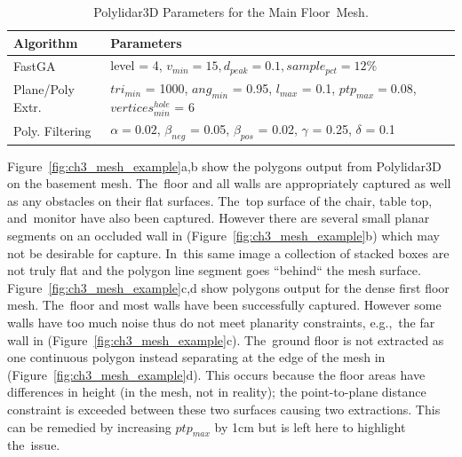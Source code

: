 \begin{table}[H]
\centering
\caption{Polylidar3D Parameters for the Main Floor~Mesh.}\label{table:mesh_parameters_b}
\begin{tabular}{@{}ll@{}}
\toprule
\textbf{Algorithm}        & \textbf{Parameters}                                                          \\ \midrule
FastGA           & level = 4,  $v_{min} = 15, d_{peak} = 0.1, sample_{pct} = 12\%$            \\
Plane/Poly Extr.      & $tri_{min}$ = 1000, $ang_{min}$ = 0.95, $l_{max}$ = 0.1, $ptp_{max} = 0.08$, $vertices^{hole}_{min}$ = 6     \\
Poly. Filtering      & $\alpha = 0.02$, $\beta_{neg}$ = 0.05, $\beta_{pos}$ = 0.02, $\gamma$ = 0.25, $\delta$ = 0.1    \\ \bottomrule
\end{tabular}
\end{table}

Figure~\ref{fig:ch3_mesh_example}a,b show the polygons output from Polylidar3D on the basement mesh.  The~floor and all walls are appropriately captured as well as any obstacles on their flat surfaces. The~top surface of the chair, table top, and~monitor have also been captured. However there are several small planar segments on an occluded wall in (Figure~\ref{fig:ch3_mesh_example}b) which may not be desirable for capture. In~this same image a collection of stacked boxes are not truly flat and the polygon line segment goes ``behind`` the mesh surface.  Figure~\ref{fig:ch3_mesh_example}c,d show  polygons output for the dense first floor mesh. The~floor and most walls have been successfully captured. However some walls have too much noise thus do not meet planarity constraints, e.g.,~the far wall in (Figure~\ref{fig:ch3_mesh_example}c). The~ground floor is not extracted as one continuous polygon instead separating at the edge of the mesh in (Figure~\ref{fig:ch3_mesh_example}d).  This occurs because the floor areas have differences in height (in the mesh, not in reality); the point-to-plane distance constraint is exceeded between these two surfaces causing two extractions. This can be remedied by increasing $ptp_{max}$ by 1cm but is left here to highlight the~issue.


